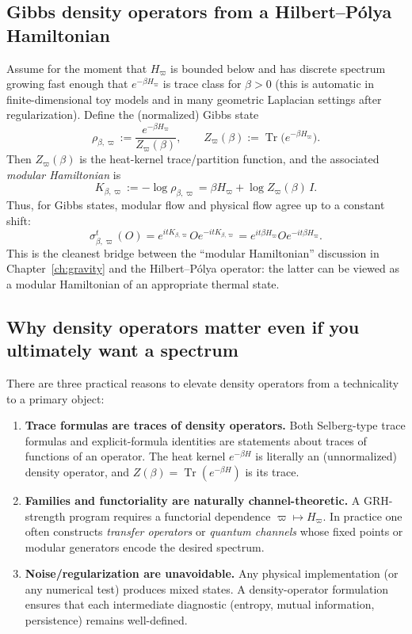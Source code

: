 \documentclass[11pt,oneside]{amsbook}
\numberwithin{equation}{section}
\theoremstyle{plain}
\theoremstyle{definition}
\theoremstyle{remark}
\DeclareMathOperator{\Tr}{\mathrm{Tr}}
\begin{document}
\subsection{Gibbs density operators from a Hilbert--Pólya Hamiltonian}
Assume for the moment that $H_\varpi$ is bounded below and has discrete spectrum growing fast enough that $e^{-\beta H_\varpi}$ is trace class for $\beta>0$ (this is automatic in finite-dimensional toy models and in many geometric Laplacian settings after regularization).
Define the (normalized) Gibbs state
\begin{equation}
\label{eq:gibbs_state}
\rho_{\beta,\varpi}:=\frac{e^{-\beta H_\varpi}}{Z_\varpi(\beta)},\qquad
Z_\varpi(\beta):=\Tr\bigl(e^{-\beta H_\varpi}\bigr).
\end{equation}
Then $Z_\varpi(\beta)$ is the heat-kernel trace/partition function, and the associated \emph{modular Hamiltonian} is
\[
K_{\beta,\varpi}:=-\log\rho_{\beta,\varpi}=\beta H_\varpi + \log Z_\varpi(\beta)\,I.
\]
Thus, for Gibbs states, modular flow and physical flow agree up to a constant shift:
\[
\sigma_{\beta,\varpi}^t(O)=e^{itK_{\beta,\varpi}}Oe^{-itK_{\beta,\varpi}}
=
e^{it\beta H_\varpi}Oe^{-it\beta H_\varpi}.
\]
This is the cleanest bridge between the ``modular Hamiltonian'' discussion in Chapter~\ref{ch:gravity} and the Hilbert--Pólya operator: the latter can be viewed as a modular Hamiltonian of an appropriate thermal state.

\subsection{Why density operators matter even if you ultimately want a spectrum}
There are three practical reasons to elevate density operators from a technicality to a primary object:
\begin{enumerate}
\item \textbf{Trace formulas are traces of density operators.}
Both Selberg-type trace formulas and explicit-formula identities are statements about traces of functions of an operator.
The heat kernel $e^{-\beta H}$ is literally an (unnormalized) density operator, and $Z(\beta)=\Tr(e^{-\beta H})$ is its trace.
\item \textbf{Families and functoriality are naturally channel-theoretic.}
A GRH-strength program requires a functorial dependence $\varpi\mapsto H_\varpi$.
In practice one often constructs \emph{transfer operators} or \emph{quantum channels} whose fixed points or modular generators encode the desired spectrum.
\item \textbf{Noise/regularization are unavoidable.}
Any physical implementation (or any numerical test) produces mixed states.
A density-operator formulation ensures that each intermediate diagnostic (entropy, mutual information, persistence) remains well-defined.
\end{enumerate}
\end{document}
